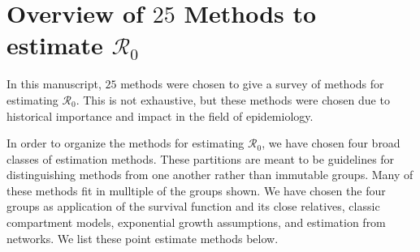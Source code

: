 \documentclass[12pt]{article}
\newcommand{\XX}{\ensuremath{25}} %
\newcommand{\rr}{\ensuremath{\mathcal{R}_0}}
\begin{document}
\section{Overview of $\XX$ Methods to estimate $\rr$}
\label{sec:overview}

In this manuscript, $\XX$ methods were chosen to give a survey of methods for estimating $\rr$.  This is not exhaustive, but these methods were chosen due to historical importance and impact in the field of epidemiology. 

In order to organize the methods for estimating $\rr$, we have chosen four broad classes of estimation methods.  These partitions are meant to be guidelines for distinguishing methods from one another rather than immutable groups.  Many of these methods  fit in  mulltiple of the groups shown.  We have chosen the four groups as application of the survival function and its close relatives, classic compartment models, exponential growth assumptions, and estimation from networks.  We list these point estimate methods below.
\end{document}
